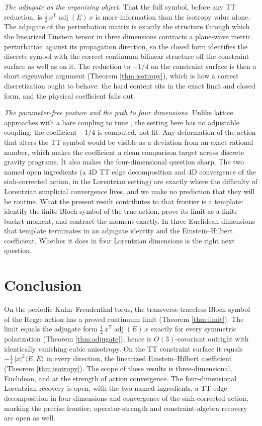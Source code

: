\documentclass[11pt]{article}
\theoremstyle{definition}
\theoremstyle{remark}
\DeclareMathOperator{\adjE}{adj}
\newcommand{\trans}{\mathsf{T}}
\begin{document}
\emph{The adjugate as the organizing object.} That the full symbol, before any TT reduction, is $\tfrac12\,x^{\trans}\adjE(E)\,x$ is more information than the isotropy value alone. The adjugate of the perturbation matrix is exactly the structure through which the linearized Einstein tensor in three dimensions contracts a plane-wave metric perturbation against its propagation direction, so the closed form identifies the discrete symbol with the correct continuum bilinear structure off the constraint surface as well as on it. The reduction to $-1/4$ on the constraint surface is then a short eigenvalue argument (Theorem \ref{thm:isotropy}), which is how a correct discretization ought to behave: the hard content sits in the exact limit and closed form, and the physical coefficient falls out.

\emph{The parameter-free posture and the path to four dimensions.} Unlike lattice approaches with a bare coupling to tune \cite{AJL, Loll, Hamber}, the setting here has no adjustable coupling; the coefficient $-1/4$ is computed, not fit. Any deformation of the action that alters the TT symbol would be visible as a deviation from an exact rational number, which makes the coefficient a clean comparison target across discrete gravity programs. It also makes the four-dimensional question sharp. The two named open ingredients (a 4D TT edge decomposition and 4D convergence of the sinh-corrected action, in the Lorentzian setting) are exactly where the difficulty of Lorentzian simplicial convergence \cite{Brewin} lives, and we make no prediction that they will be routine. What the present result contributes to that frontier is a template: identify the finite Bloch symbol of the true action, prove its limit as a finite bucket moment, and contract the moment exactly. In three Euclidean dimensions that template terminates in an adjugate identity and the Einstein--Hilbert coefficient. Whether it does in four Lorentzian dimensions is the right next question.

\section{Conclusion}
\label{sec:conclusion}

On the periodic Kuhn--Freudenthal torus, the transverse-traceless Bloch symbol of the Regge action has a proved continuum limit (Theorem \ref{thm:limit}). The limit equals the adjugate form $\tfrac12\,x^{\trans}\adjE(E)\,x$ exactly for every symmetric polarization (Theorem \ref{thm:adjugate}), hence is $O(3)$-covariant outright with identically vanishing cubic anisotropy. On the TT constraint surface it equals $-\tfrac14\,|x|^2\langle E,E\rangle$ in every direction, the linearized Einstein--Hilbert coefficient (Theorem \ref{thm:isotropy}). The scope of these results is three-dimensional, Euclidean, and at the strength of action convergence. The four-dimensional Lorentzian recovery is open, with the two named ingredients, a TT edge decomposition in four dimensions and convergence of the sinh-corrected action, marking the precise frontier; operator-strength and constraint-algebra recovery are open as well.
\end{document}
